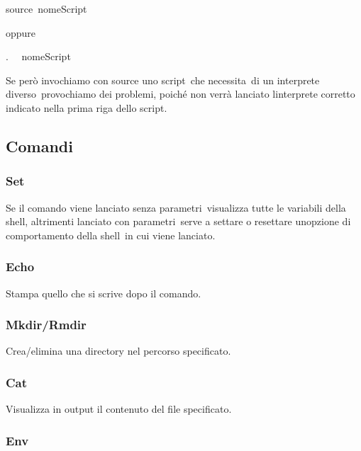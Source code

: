 \documentclass[
]{article}
\begin{document}
{}

{source}{~}{nomeScript}{~}

{oppure}

{}

{. ~}{~}{nomeScript}

{}

{Se però invochiamo con source uno script}{~che necessita}{~di un
}{interprete diverso}{~provochiamo dei problemi, poiché }{non verrà
lanciato l\textquotesingle interprete corretto }{indicato nella prima
riga dello script.}

\subsection{\texorpdfstring{{Comandi}}{Comandi}}\label{h.q7fep3v91n2i}

\subsubsection{\texorpdfstring{{Set}}{Set}}\label{h.dx2a94e7s5il}

{Se il comando viene lanciato }{senza parametri}{~visualizza tutte le
variabili della shell}{, altrimenti lanciato }{con parametri}{~serve a
}{settare o resettare un\textquotesingle opzione di comportamento della
shell}{~in cui viene lanciato.}

\subsubsection{\texorpdfstring{{Echo}}{Echo}}\label{h.ultvyv6feag4}

{Stampa quello che si scrive dopo il comando.}

\subsubsection{\texorpdfstring{{Mkdir/Rmdir}}{Mkdir/Rmdir}}\label{h.temawjp7mx6y}

{Crea/elimina una directory nel percorso specificato.}

\subsubsection{\texorpdfstring{{Cat}}{Cat}}\label{h.na34hz2wfgir}

{Visualizza in output il contenuto del file specificato.}

\subsubsection{\texorpdfstring{{Env}}{Env}}\label{h.ftgv9yksgljz}
\end{document}
